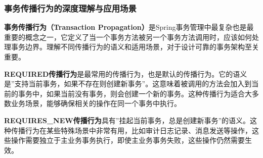 \begin{Shaded}
\begin{Highlighting}[]
    \OperatorTok{(}\OperatorTok{=}\OperatorTok{,} 
\OperatorTok{=} \OperatorTok{)}
      \OperatorTok{(}\OperatorTok{)} \OperatorTok{\{}
        
\OperatorTok{=} \OperatorTok{(}\OperatorTok{);}
\OperatorTok{(}\OperatorTok{);}
        
\OperatorTok{(}\OperatorTok{);}
        
        \OperatorTok{(}\OperatorTok{(),} \OperatorTok{);}
    \OperatorTok{\}}
\OperatorTok{\}}
\end{Highlighting}
\end{Shaded}

\subsubsection{事务传播行为的深度理解与应用场景}\label{ux4e8bux52a1ux4f20ux64adux884cux4e3aux7684ux6df1ux5ea6ux7406ux89e3ux4e0eux5e94ux7528ux573aux666f}

\textbf{事务传播行为（Transaction Propagation）}是Spring事务管理中最复杂也是最重要的概念之一，它定义了当一个事务方法被另一个事务方法调用时，应该如何处理事务边界。理解不同传播行为的语义和适用场景，对于设计可靠的事务架构至关重要。

\textbf{REQUIRED传播行为}是最常用的传播行为，也是默认的传播行为。它的语义是''支持当前事务，如果不存在则创建新事务''。这意味着被调用的方法会加入到当前的事务中，如果当前没有事务，则会创建一个新的事务。这种传播行为适合大多数业务场景，能够确保相关的操作在同一个事务中执行。

\textbf{REQUIRES\_NEW传播行为}具有''挂起当前事务，总是创建新事务''的语义。这种传播行为在某些特殊场景中非常有用，比如审计日志记录、消息发送等操作，这些操作需要独立于主业务事务执行，即使主业务事务失败，这些操作仍然需要生效。

